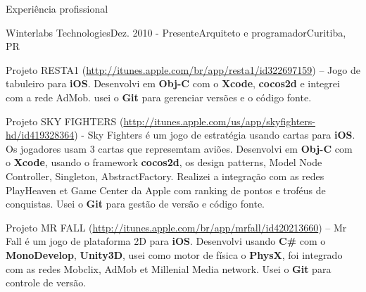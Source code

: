 \documentclass{resume}
\begin{document}
\begin{rSection}{Experiência profissional}
\begin{rSubsection}{Winterlabs Technologies}{Dez. 2010 - Presente}{Arquiteto e programador}{Curitiba, PR}
    \item Projeto RESTA1 (\url{http://itunes.apple.com/br/app/resta1/id322697159}) – Jogo de tabuleiro para \textbf{iOS}. Desenvolvi em \textbf{Obj-C} com o \textbf{Xcode}, \textbf{cocos2d} e integrei com a rede AdMob. usei o \textbf{Git} para gerenciar versões e o código fonte.\\
    \item Projeto SKY FIGHTERS (\url{http://itunes.apple.com/us/app/skyfighters-hd/id419328364}) - Sky Fighters é um jogo de estratégia usando cartas para \textbf{iOS}. Os jogadores usam 3 cartas que represemtam aviões. Desenvolvi em \textbf{Obj-C} com o \textbf{Xcode}, usando o framework \textbf{cocos2d}, os design patterns, Model Node Controller, Singleton, AbstractFactory. Realizei a integração com as redes PlayHeaven et Game Center da Apple com ranking de pontos e troféus de conquistas. Usei o \textbf{Git} para gestão de versão e código fonte. \\
    \item Projeto MR FALL (\url{http://itunes.apple.com/br/app/mrfall/id420213660}) – Mr Fall é um jogo de plataforma 2D para \textbf{iOS}. Desenvolvi usando \textbf{C\#} com o \textbf{MonoDevelop}, \textbf{Unity3D}, usei como motor de física o \textbf{PhysX}, foi integrado com as redes Mobclix, AdMob et Millenial Media network. Usei o \textbf{Git} para controle de versão. \\

\end{rSubsection}
\end{rSection}
\end{document}
